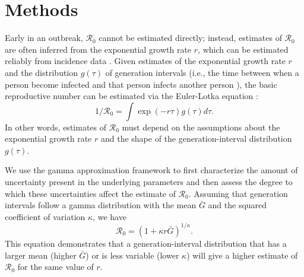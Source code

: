 \documentclass[12pt]{article}
\begin{document}
\section{Methods}

Early in an outbreak, $\mathcal R_0$ cannot be estimated directly;
instead, estimates of $\mathcal R_0$ are often inferred from
the exponential growth rate $r$, which can be estimated reliably from incidence data \citep{chowell2003sars, mills2004transmissibility, nishiura2009transmission, nishiura2010pros, ma2014estimating}.
Given estimates of the exponential growth rate $r$ and the distribution $g(\tau)$ of
generation intervals (i.e., the time between when a person become 
infected and that person infects another person \citep{svensson2007note}), the basic reproductive
number can be estimated via the Euler-Lotka equation \citep{wallinga2007generation}:
\begin{equation}
1/\mathcal R_0 = \int \exp(-r\tau) g(\tau) d\tau.
\end{equation}
In other words, estimates of $\mathcal R_0$
must depend on the assumptions about the
exponential growth rate $r$ and the shape of the generation-interval distribution $g(\tau)$.

We use the gamma approximation framework \citep{park2019practical} to first characterize the
amount of uncertainty present in the underlying parameters and then assess the 
degree to which these uncertainties
affect the estimate of $\mathcal R_0$.
Assuming that generation intervals follow a gamma distribution 
with the mean $\bar G$ and the squared coefficient of variation $\kappa$, 
we have
\begin{equation}
\mathcal R_0 = \left(1 + \kappa r \bar{G}\right)^{1/\kappa}.
\label{eq:gamma}
\end{equation}
This equation demonstrates that a generation-interval distribution
that has a larger mean (higher $\bar{G}$) or is less variable (lower $\kappa$)
will give a higher estimate of $\mathcal R_0$ for the same value of $r$.
\end{document}
